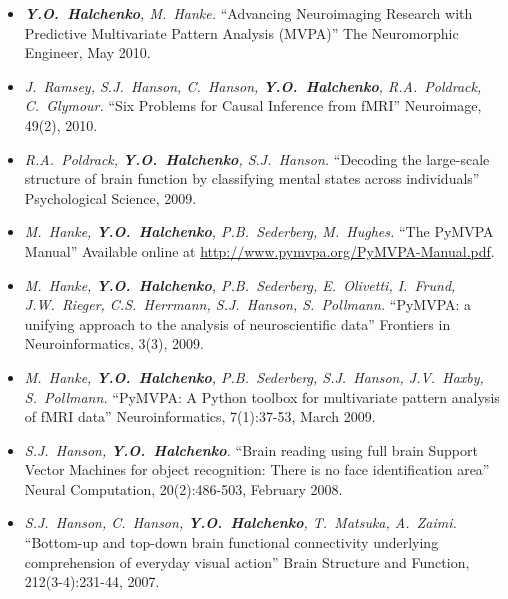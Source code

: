 \documentclass[12pt,overlapped,line]{res}
\newcommand{\mtitle}[1]{``#1''}
\newcommand{\mauthors}[1]{ \textit{#1.}}
\newcommand{\mwhere}[1]{#1.}
\begin{document}
\begin{resume}
\begin{itemize}
 \item
   \mauthors{\textbf{Y.O.~Halchenko}, M.~Hanke}
    \mtitle{Advancing Neuroimaging Research with Predictive Multivariate
      Pattern Analysis (MVPA)}
    \mwhere{The Neuromorphic Engineer, May 2010}

 \item
   \mauthors{J.~Ramsey, S.J.~Hanson, C.~Hanson, \textbf{Y.O.~Halchenko},
     R.A.~Poldrack, C.~Glymour}
   \mtitle{Six Problems for Causal Inference from fMRI}
   \mwhere{Neuroimage, 49(2), 2010}

 \item
   \mauthors{R.A.~Poldrack, \textbf{Y.O.~Halchenko}, S.J.~Hanson}
   \mtitle{Decoding the large-scale structure of brain function by
     classifying mental states across individuals}
   \mwhere{Psychological Science, 2009}

  \item
    \mauthors{M.~Hanke, \textbf{Y.O.~Halchenko}, P.B.~Sederberg, M.~Hughes}
    \mtitle{The PyMVPA Manual}
    \mwhere{\newline Available online at \url{http://www.pymvpa.org/PyMVPA-Manual.pdf}}

 \item
   \mauthors{ M.~Hanke, \textbf{Y.O.~Halchenko}, P.B.~Sederberg, E.~Olivetti, I.~Frund, J.W.~Rieger, C.S.~Herrmann, S.J.~Hanson, S.~Pollmann}
    \mtitle{PyMVPA: a unifying approach to the analysis of neuroscientific data}
    \mwhere{Frontiers in Neuroinformatics, 3(3), 2009}

  \item
    \mauthors{M.~Hanke, \textbf{Y.O.~Halchenko}, P.B.~Sederberg, S.J.~Hanson, J.V.~Haxby, S.~Pollmann}
    \mtitle{PyMVPA: A Python toolbox for multivariate pattern analysis of fMRI data}
    \mwhere{Neuroinformatics, 7(1):37-53, March 2009}

  \item
    \mauthors{S.J.~Hanson, \textbf{Y.O.~Halchenko}}
    \mtitle{Brain reading using full brain Support Vector Machines for
      object recognition: There is no face identification area}
    \mwhere{Neural Computation, 20(2):486-503, February 2008}

  \item
    \mauthors{S.J.~Hanson, C.~Hanson, \textbf{Y.O.~Halchenko}, T.~Matsuka, A.~Zaimi}
    \mtitle{Bottom-up and top-down brain functional connectivity underlying comprehension of everyday visual action}
    \mwhere{Brain Structure and Function, 212(3-4):231-44, 2007}


\end{itemize}
\end{resume}
\end{document}
